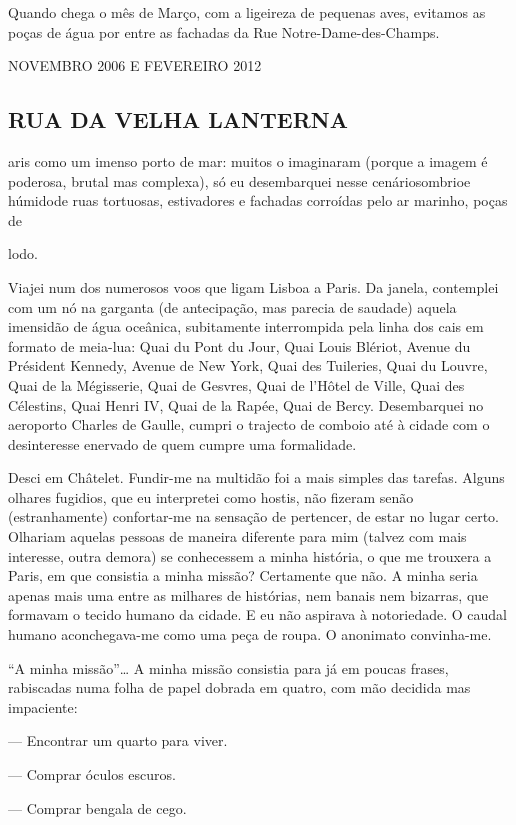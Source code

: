 Quando chega o mês de Março, com a ligeireza de pequenas aves,
evitamos as poças de água por entre as fachadas da Rue
Notre-Dame-des-Champs.

NOVEMBRO 2006 E FEVEREIRO 2012

\subsection{RUA DA VELHA LANTERNA}

aris como um imenso porto de mar: muitos o imaginaram (porque a imagem é
poderosa, brutal mas complexa), só eu desembarquei nesse cenáriosombrioe
húmidode ruas tortuosas, estivadores e fachadas corroídas pelo ar
marinho, poças de

lodo.

Viajei num dos numerosos voos que ligam Lisboa a Paris. Da janela,
contemplei com um nó na garganta (de antecipação, mas parecia de
saudade) aquela imensidão de água oceânica, subitamente interrompida
pela linha dos cais em formato de meia-lua: Quai du Pont du Jour, Quai
Louis Blériot, Avenue du Président Kennedy, Avenue de New York, Quai des
Tuileries, Quai du Louvre, Quai de la Mégisserie, Quai de Gesvres, Quai
de l'Hôtel de Ville, Quai des Célestins, Quai Henri IV, Quai de la
Rapée, Quai de Bercy. Desembarquei no aeroporto Charles de Gaulle,
cumpri o trajecto de comboio até à cidade com o desinteresse enervado de
quem cumpre uma formalidade.

Desci em Châtelet. Fundir-me na multidão foi a mais simples das tarefas.
Alguns olhares fugidios, que eu interpretei como hostis, não fizeram
senão (estranhamente) confortar-me
na sensação de pertencer, de estar no lugar certo. Olhariam aquelas
pessoas de maneira diferente para mim (talvez com mais interesse, outra
demora) se conhecessem a minha história, o que me trouxera a Paris, em
que consistia a minha missão? Certamente que não. A minha seria apenas
mais uma entre as milhares de histórias, nem banais nem bizarras, que
formavam o tecido humano da cidade. E eu não aspirava à notoriedade. O
caudal humano aconchegava-me como uma peça de roupa. O anonimato
convinha-me.

``A minha missão''\ldots{} A minha missão consistia para já em poucas
frases, rabiscadas numa folha de papel dobrada em quatro, com mão
decidida mas impaciente:

--- Encontrar um quarto para viver.

--- Comprar óculos escuros.

--- Comprar bengala de cego.

